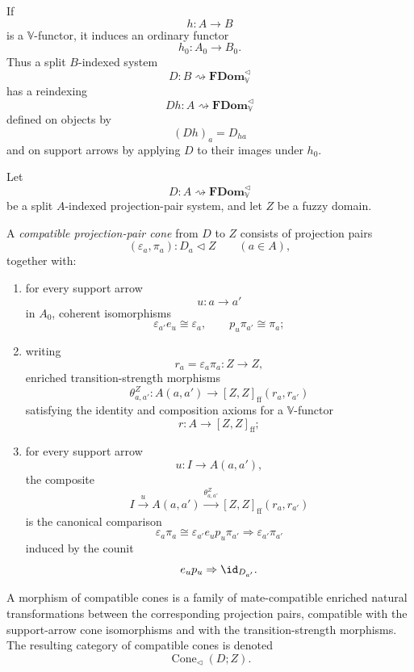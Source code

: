 If
\[
    h:A\to B
\]
is a \(\mathbb V\)-functor, it induces an ordinary functor
\[
    h_0:A_0\to B_0.
\]
Thus a split \(B\)-indexed system
\[
    D:B\rightsquigarrow\mathbf{FDom}_{\mathbb V}^{\triangleleft}
\]
has a reindexing
\[
    Dh:A\rightsquigarrow\mathbf{FDom}_{\mathbb V}^{\triangleleft}
\]
defined on objects by
\[
    (Dh)_a=D_{ha}
\]
and on support arrows by applying \(D\) to their images under \(h_0\).

\begin{definition}
\label{def:compatible-projection-pair-cone-split}
Let
\[
    D:A\rightsquigarrow\mathbf{FDom}_{\mathbb V}^{\triangleleft}
\]
be a split \(A\)-indexed projection-pair system, and let \(Z\) be a fuzzy
domain.

A \emph{compatible projection-pair cone} from \(D\) to \(Z\) consists of
projection pairs
\[
    (\varepsilon_a,\pi_a):D_a\triangleleft Z
    \qquad(a\in A),
\]
together with:

\begin{enumerate}
    \item for every support arrow
    \[
        u:a\to a'
    \]
    in \(A_0\), coherent isomorphisms
    \[
        \varepsilon_{a'}e_u\cong \varepsilon_a,
        \qquad
        p_u\pi_{a'}\cong \pi_a;
    \]

    \item writing
    \[
        r_a=\varepsilon_a\pi_a:Z\to Z,
    \]
    enriched transition-strength morphisms
    \[
        \theta^Z_{a,a'}:
        A(a,a')
        \longrightarrow
        [Z,Z]_{\mathrm{ff}}(r_a,r_{a'})
    \]
    satisfying the identity and composition axioms for a \(\mathbb V\)-functor
    \[
        r:A\to[Z,Z]_{\mathrm{ff}};
    \]

    \item for every support arrow
    \[
        u:I\to A(a,a'),
    \]
    the composite
    \[
        I
        \xrightarrow{u}
        A(a,a')
        \xrightarrow{\theta^Z_{a,a'}}
        [Z,Z]_{\mathrm{ff}}(r_a,r_{a'})
    \]
    is the canonical comparison
    \[
        \varepsilon_a\pi_a
        \cong
        \varepsilon_{a'}e_u p_u\pi_{a'}
        \Rightarrow
        \varepsilon_{a'}\pi_{a'}
    \]
    induced by the counit
    \[
        e_u p_u\Rightarrow \id_{D_{a'}}.
    \]
\end{enumerate}

A morphism of compatible cones is a family of mate-compatible enriched natural
transformations between the corresponding projection pairs, compatible with the
support-arrow cone isomorphisms and with the transition-strength morphisms.  The
resulting category of compatible cones is denoted
\[
    \operatorname{Cone}_{\triangleleft}(D;Z).
\]
\end{definition}

